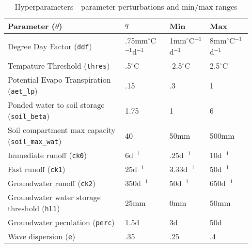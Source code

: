\begin{table}[]
\caption{Hyperparameters - parameter perturbations and min/max ranges} 
\begin{tabular}{llll}
Parameter ($\theta$) & $q$ & Min & Max \\ \hline
Degree Day Factor (\texttt{ddf})                 & .75mm$^\circ$C$^{-1}$d$^{-1}$ & 1mm$^\circ$C$^{-1}$d$^{-1}$ & 8mm$^\circ$C$^{-1}$d$^{-1}$ \\
Tempature Threshold (\texttt{thres})                & .5$^\circ$C & -2.5$^\circ$C & 2.5$^\circ$C \\
Potential Evapo-Transpiration (\texttt{aet\_lp})              & .15 & .3 & 1\\
Ponded water to soil storage (\texttt{soil\_beta})          & 1.75 & 1 & 6 \\
Soil compartment max capacity (\texttt{soil\_max\_wat})       & 40 & 50mm & 500mm \\
Immediate runoff (\texttt{ck0})       & 6d$^{-1}$ & .25d$^{-1}$ & 10d$^{-1}$ \\
Fast runoff (\texttt{ck1})      & 25d$^{-1}$ & 3.33d$^{-1}$ & 50d$^{-1}$\\
Groundwater runoff (\texttt{ck2})       & 350d$^{-1}$ & 50d$^{-1}$ & 650d$^{-1}$ \\
Groundwater water storage threshold (\texttt{hl1})       & 25mm & 0mm & 50mm \\
Groundwater peculation (\texttt{perc})       & 1.5d & 3d & 50d \\
Wave dispersion (\texttt{e})       & .35 & .25 & .4 \\
\end{tabular}
\label{tab:t_param_min_max_initial}
\end{table}

